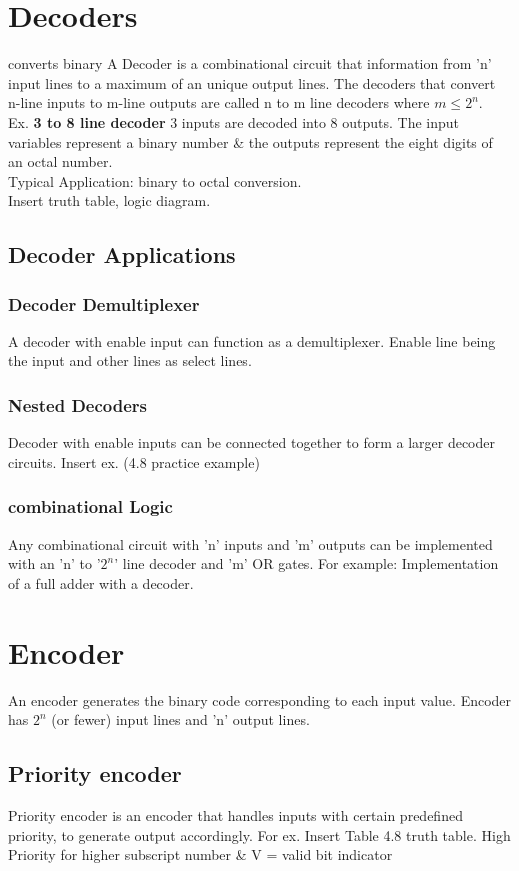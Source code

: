\section{Decoders}
converts binary A Decoder is a combinational circuit that information from 'n' input lines to a maximum of an unique output lines. The decoders that convert n-line inputs to m-line outputs are called n to m line decoders where \(m \leqslant 2^n\).\\ 
Ex. \textbf{3 to 8 line decoder} 3 inputs are decoded into 8 outputs. The input variables represent a binary number \& the outputs represent the eight digits of an octal number.\\
Typical Application: binary to octal conversion.\\
Insert truth table, logic diagram.

\subsection{Decoder Applications}

\subsubsection{Decoder Demultiplexer}
A decoder with enable input can function as a demultiplexer. Enable line being the input and other lines as select lines. 

\subsubsection{Nested Decoders} Decoder with enable inputs can be connected together to form a larger decoder circuits. Insert ex. (4.8 practice example) 

\subsubsection{combinational Logic}
Any combinational circuit with 'n' inputs and 'm' outputs can be implemented with an 'n' to '\(2^n\)' line decoder and 'm' OR gates. For example: Implementation of a full adder with a decoder.

\section{Encoder}
An encoder generates the binary code corresponding to each input value. Encoder has \(2^n\) (or fewer) input lines and 'n' output lines. 

\subsection{Priority encoder} 
Priority encoder is an encoder that handles inputs with certain predefined priority, to generate output accordingly. For ex. Insert Table 4.8 truth table. High Priority for higher subscript number \& V = valid bit indicator 


